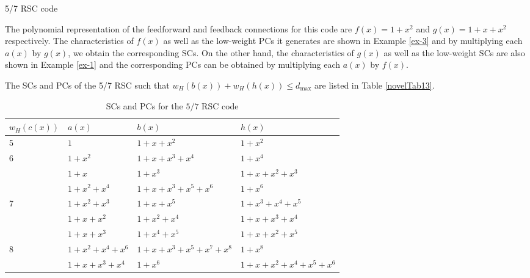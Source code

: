\begin{example} {5/7 RSC code}

The polynomial representation of the feedforward and feedback connections for this code are $f(x)=1+x^2$ and $g(x)=1+x+x^2$ respectively. The characteristics of $f(x)$ as well as the low-weight PCs it generates are shown in Example \ref{ex-3} and by multiplying each $a(x)$ by $g(x)$, we obtain the corresponding SCs. On the other hand, the characteristics of $g(x)$ as well as the low-weight SCs are also shown in  Example \ref{ex-1} and the corresponding PCs can be obtained by multiplying each $a(x)$ by $f(x)$.

The SCs and PCs of the 5/7 RSC such that $w_H(b(x))+w_H(h(x)) \leq d_{\text{max}}$ are listed in Table \ref{novelTab13}. 

\begin{table}[htbp]
	\caption{SCs and PCs for the $5/7$ RSC code}
	\centering
	\begin{tabularx}{0.75\textwidth}{Xlll} 
		\hline
		$w_H(c(x))$& $a(x)$ & $b(x)$ & $h(x)$ \\ %
		\hline\hline
		5&$1$ & $1+x+x^{2}$ & $1+x^2$\\
		\hline\hline
		6&$1+x^2$ & $1+x+x^3+x^4$ & $1+x^{4}$\\
		&$1+x$ & $1+x^3$ & $1+x+x^2+x^3$\\
		\hline\hline
		&$1+x^2+x^4$ & $1+x+x^3+x^5+x^6$ & $1+x^{6}$\\
		7&$1+x^2+x^3$ & $1+x+x^5$ & $1+x^3+x^4+x^5$\\
		&$1+x+x^2$ & $1+x^2+x^4$ & $1+x+x^3+x^4$\\
		&$1+x+x^3$ & $1+x^4+x^5$ & $1+x+x^2+x^5$\\
		\hline \hline
		8&$1+x^2+x^4+x^6$ & $1+x+x^3+x^5+x^7+x^8$ & $1+x^8$\\
		&$1+x+x^3+x^4$ & $1+x^6$ & $1+x+x^2+x^4+x^5+x^6$\\
		\hline
	\end{tabularx}
	

\end{table}
\end{example}
